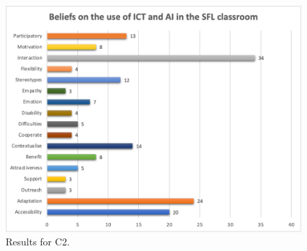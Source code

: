 \documentclass[english]{textolivre}
\begin{document}
\begin{figure}[h!]
    \centering
    \begin{minipage}{0.90\linewidth}
    \includegraphics[width=\linewidth]{Images/FIGURA2.png}
    \caption{Results for C2.}
    \label{fig-2}
    \end{minipage}
\end{figure}
\end{document}
